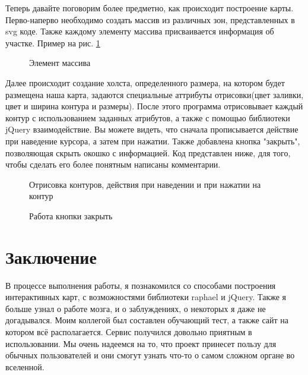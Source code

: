 Теперь давайте поговорим более предметно, как происходит построение карты. Перво-наперво необходимо создать массив из различных зон, представленных в svg коде. Также каждому элементу массива присваивается информация об участке. Пример на рис. \ref{ris:mas}
\begin{figure}[h]
	\center{\texttt{[image: 5]}}
	\caption{Элемент массива}
	\label{ris:mas}
\end{figure}

Далее происходит создание холста, определенного размера, на котором будет размещена наша карта, задаются специальные аттрибуты отрисовки(цвет заливки, цвет и ширина контура и размеры). 
После этого программа отрисовывает каждый контур с использованием заданных атрибутов, а также с помощью библиотеки jQuery взаимодействие. Вы можете видеть, что сначала прописывается действие при наведение курсора, а затем при нажатии. Также добавлена кнопка "закрыть", позволяющая скрыть окошко с информацией. Код представлен ниже, для того, чтобы сделать его более понятным написаны комментарии.
\begin{figure}[h]
	\center{\texttt{[image: 6]}}
	\caption{Отрисовка контуров, действия при наведении и при нажатии на контур}
	\label{ris:m}
\end{figure}

\begin{figure}[h]
	\center{\texttt{[image: 7]}}
	\caption{Работа кнопки закрыть}
	\label{ris:m}
\end{figure}



\section{Заключение}
В процессе выполнения работы, я познакомился со способами построения интерактивных карт, с возможностями библиотеки raphael и jQuery. Также я больше узнал о работе мозга, и о заблуждениях, о некоторых я даже не догадывался. Моим коллегой был составлен обучающий тест, а также сайт на котором всё располагается. Сервис получился довольно приятным в использовании. Мы очень надеемся на то, что проект принесет пользу для обычных пользователей и они смогут узнать что-то о самом сложном органе во вселенной. 